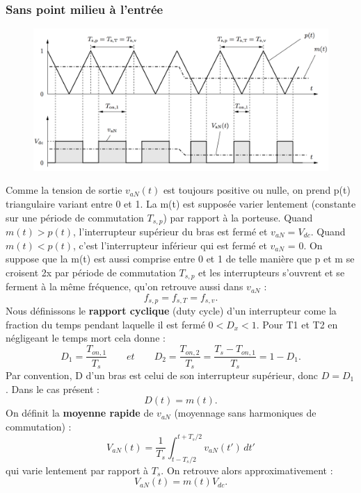 	 	\subsubsection{Sans point milieu à l'entrée}
	 		\begin{figure}
			\vspace{-5mm}
			\includegraphics[scale=0.2]{ch4/6}
			\end{figure}
			Comme la tension de sortie $v_{aN}(t)$ est toujours positive ou nulle, on prend p(t) triangulaire variant entre 0 et 1. La m(t) est supposée varier lentement (constante sur une période de commutation $T_{s,p}$) par rapport à la porteuse. Quand $m(t) > p(t)$, l'interrupteur supérieur du bras est fermé et $v_{aN} = V_{dc}$. Quand $m(t) < p(t)$, c'est l'interrupteur inférieur qui est fermé et $v_{aN}$ = 0. On suppose que la m(t) est aussi comprise entre 0 et 1 de telle manière que p et m se croisent 2x par période de commutation $T_{s,p}$ et les interrupteurs s'ouvrent et se ferment à la même fréquence, qu'on retrouve aussi dans $v_{aN}$ : 
			\begin{equation}
				f_{s,p} = f_{s,T} = f_{s,v}. 
			\end{equation}
			Nous définissons le \textbf{rapport cyclique} (duty cycle) d'un interrupteur come la fraction du temps pendant laquelle il est fermé $0<D_x<1$. Pour T1 et T2 en négligeant le temps mort cela donne : 
			\begin{equation}
				D_1 = \frac{T_{on,1}}{T_s} \qquad et \qquad D_2 = \frac{T_{on,2}}{T_s} = \frac{T_s - T_{on,1}}{T_s} = 1 - D_1.
			\end{equation}
			Par convention, D d'un bras est celui de son interrupteur supérieur, donc $D = D_1$. Dans le cas présent :
			\begin{equation}
				D(t) = m(t). 
			\end{equation}
			On définit la \textbf{moyenne rapide} de $v_{aN}$ (moyennage sans harmoniques de commutation) : 
			\begin{equation}
				V_{aN}(t) = \frac{1}{T_s}\int _{t-T_s/2}^{t+T_s/2} v_{aN}(t') \, dt'
			\end{equation}
			qui varie lentement par rapport à $T_s$. On retrouve alors  approximativement : 
			\begin{equation}
				V_{aN}(t) = m(t) V_{dc}. 
			\end{equation}
			

